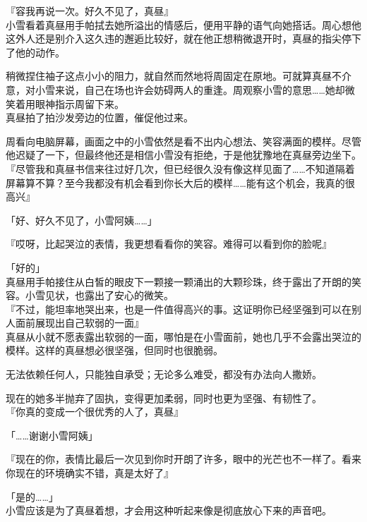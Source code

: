 『容我再说一次。好久不见了，真昼』\\

小雪看着真昼用手帕拭去她所溢出的情感后，便用平静的语气向她搭话。周心想他这外人还是别介入这久违的邂逅比较好，就在他正想稍微退开时，真昼的指尖停下了他的动作。

稍微捏住袖子这点小小的阻力，就自然而然地将周固定在原地。可就算真昼不介意，对小雪来说，自己在场也许会妨碍两人的重逢。周观察小雪的意思……她却微笑着用眼神指示周留下来。\\

真昼拍了拍沙发旁边的位置，催促他过来。

周看向电脑屏幕，画面之中的小雪依然是看不出内心想法、笑容满面的模样。尽管他迟疑了一下，但最终他还是相信小雪没有拒绝，于是他犹豫地在真昼旁边坐下。\\

『尽管我和真昼书信来往过好几次，但已经很久没有像这样见面了……不知道隔着屏幕算不算？至今我都没有机会看到你长大后的模样……能有这个机会，我真的很高兴』

「好、好久不见了，小雪阿姨……」

『哎呀，比起哭泣的表情，我更想看看你的笑容。难得可以看到你的脸呢』

「好的」\\

真昼用手帕接住从白皙的眼皮下一颗接一颗涌出的大颗珍珠，终于露出了开朗的笑容。小雪见状，也露出了安心的微笑。\\

『不过，能坦率地哭出来，也是一件值得高兴的事。这证明你已经坚强到可以在别人面前展现出自己软弱的一面』\\

真昼从小就不愿表露出软弱的一面，哪怕是在小雪面前，她也几乎不会露出哭泣的模样。这样的真昼想必很坚强，但同时也很脆弱。

无法依赖任何人，只能独自承受；无论多么难受，都没有办法向人撒娇。

现在的她多半抛弃了固执，变得更加柔弱，同时也更为坚强、有韧性了。\\

『你真的变成一个很优秀的人了，真昼』

「……谢谢小雪阿姨」

『现在的你，表情比最后一次见到你时开朗了许多，眼中的光芒也不一样了。看来你现在的环境确实不错，真是太好了』

「是的……」\\

小雪应该是为了真昼着想，才会用这种听起来像是彻底放心下来的声音吧。

